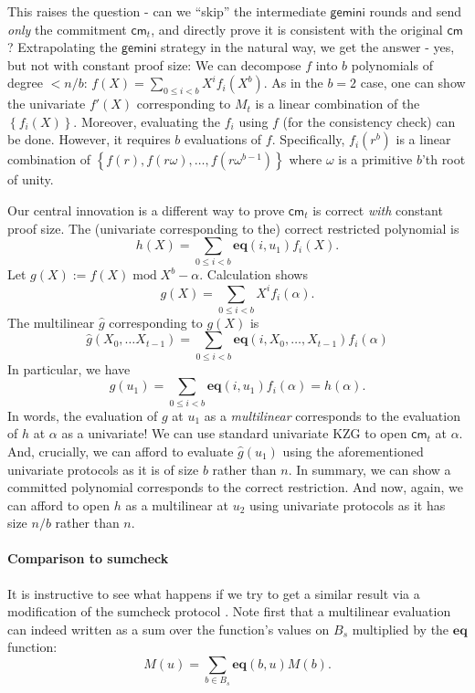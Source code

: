 \documentclass[11pt]{article} %
\newcommand{\gemini}{\ensuremath{\mathsf{gemini}}\xspace}
\newcommand{\cm}{\ensuremath{\mathsf{cm}}\xspace}
\newcommand{\defeq}{:=}
\renewcommand{\mod}{\ensuremath{\;\mathrm{mod}\;}}
\newcommand{\prv}{\ensuremath{\mathsf{\mathbf{P}}}\xspace}
\newcommand{\ver}{\ensuremath{\mathsf{\mathbf{V}}}\xspace}
\newcommand{\set}[1]{\ensuremath{\left\{#1\right\}}\xspace}
\renewcommand{\g}{\ensuremath{\mathsf{g}}\xspace}
\newcommand{\eq}{\ensuremath{\mathsf{eq}}\xspace}
\renewcommand{\eq}{\ensuremath{\mathbf{eq}}\xspace}
\newcommand{\mle}[1]{\ensuremath{\hat{#1}}\xspace}
\newcommand{\B}[1]{\ensuremath{B_{#1}}\xspace}
\begin{document}
This raises the question - can we ``skip'' the intermediate \gemini rounds and send \emph{only} the commitment $\cm_t$, and directly prove it is consistent with the original \cm?
Extrapolating the \gemini strategy in the natural way, we get the answer - yes, but not with constant proof size:
We can decompose $f$ into $b$ polynomials of degree $<n/b$: $f(X)=\sum_{0\leq i <b} X^i f_i(X^b)$.
As in the $b=2$ case, one can show the univariate $f'(X)$ corresponding to $M_t$ is a linear combination
of the \set{f_i(X)}. Moreover, evaluating the $f_i$ using $f$ (for the consistency check) can be done.
However, it requires $b$ evaluations of $f$. Specifically,
$f_i(r^b)$ is a linear combination of  $\set{f(r),f(r\omega),\ldots,f(r\omega^{b-1})}$ where $\omega$ is a primitive $b$'th root of unity.


Our central innovation is a different way to prove $\cm_t$ is correct \emph{with} constant proof size.
The (univariate corresponding to the) correct restricted polynomial is 
\[h(X) = \sum_{0\leq i < b} \eq(i,u_1)f_i(X).\]
Let $g(X)\defeq f(X) \mod X^b-\alpha$.
Calculation shows
\[g(X)= \sum_{0\leq i < b} X^i f_i(\alpha).\]
The multilinear $\mle{g}$ corresponding to $g(X)$ is 
\[\mle{g}(X_0,\ldots X_{t-1}) = \sum_{0\leq i < b} \eq(i,X_0,\ldots,X_{t-1})f_i(\alpha)
\]
In particular, we have 
\[\mle{g}(u_1) = \sum_{0\leq i < b} \eq(i,u_1)f_i(\alpha)=h(\alpha).\]
In words, the evaluation of $g$ at $u_1$ as a \emph{multilinear} corresponds to 
the evaluation of $h$ at $\alpha$ as a univariate!
We can use standard univariate KZG to open $\cm_t$ at $\alpha$.
And, crucially, we can afford to evaluate $\mle{g}(u_1)$ using the aforementioned univariate protocols as it is of size $b$ rather than $n$.
In summary, we can show a committed polynomial corresponds to the correct restriction. And now, again, we can afford to open $h$ as a multilinear at $u_2$ using univariate protocols
as it has size $n/b$ rather than $n$.
\paragraph{Comparison to sumcheck}
It is instructive to see what  happens if we try to get a similar result via a modification of the sumcheck protocol \cite{lfkn}.
Note first that a multilinear evaluation can indeed   written as a sum over the function's values on \B{s} multiplied by the \eq function:
$$ M(u) = \sum_{b \in B_s} \eq(b, u) M(b). $$
\end{document}
